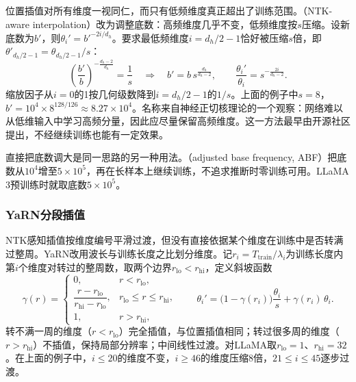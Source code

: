 位置插值对所有维度一视同仁，而只有低频维度真正超出了训练范围。（NTK-aware interpolation）改为调整底数：高频维度几乎不变，低频维度按$s$压缩。设新底数为$b'$，则$\theta_i'=b'^{-2i/d_h}$。要求最低频维度$i=d_h/2-1$恰好被压缩$s$倍，即$\theta'_{d_h/2-1}=\theta_{d_h/2-1}/s$：
\begin{equation}
 \left(\frac{b'}{b}\right)^{-\frac{d_h-2}{d_h}}=\frac1s
 \quad\Longrightarrow\quad
 b'=b\,s^{\frac{d_h}{d_h-2}},\qquad
 \frac{\theta_i'}{\theta_i}=s^{-\frac{2i}{d_h-2}}.
 \label{eq:nlp-llm-ntk-base}
\end{equation}
缩放因子从$i=0$的1按几何级数降到$i=d_h/2-1$的$1/s$。上面的例子中$s=8$，$b'=10^4\times8^{128/126}\approx8.27\times10^4$。名称来自神经正切核理论的一个观察：网络难以从低维输入中学习高频分量，因此应尽量保留高频维度。这一方法最早由开源社区提出，不经继续训练也能有一定效果。

直接把底数调大是同一思路的另一种用法。（adjusted base frequency, ABF）把底数从$10^4$增至$5\times10^5$，再在长样本上继续训练，不追求推断时零训练可用。LLaMA 3预训练时就取底数$5\times10^5$。

\subsubsection{YaRN分段插值}
\label{sec:nlp-llm-yarn}

NTK感知插值按维度编号平滑过渡，但没有直接依据某个维度在训练中是否转满过整周。YaRN改用波长与训练长度之比划分维度。记$r_i=T_{\mathrm{train}}/\lambda_i$为训练长度内第$i$个维度对转过的整周数，取两个边界$r_{\mathrm{lo}}<r_{\mathrm{hi}}$，定义斜坡函数
\begin{equation}
 \gamma(r)=
 \begin{cases}
  0, & r<r_{\mathrm{lo}},\\
  \dfrac{r-r_{\mathrm{lo}}}{r_{\mathrm{hi}}-r_{\mathrm{lo}}}, & r_{\mathrm{lo}}\leq r\leq r_{\mathrm{hi}},\\
  1, & r>r_{\mathrm{hi}},
 \end{cases}
 \qquad
 \theta_i'=\bigl(1-\gamma(r_i)\bigr)\frac{\theta_i}{s}+\gamma(r_i)\,\theta_i.
 \label{eq:nlp-llm-yarn-ramp}
\end{equation}
转不满一周的维度（$r<r_{\mathrm{lo}}$）完全插值，与位置插值相同；转过很多周的维度（$r>r_{\mathrm{hi}}$）不插值，保持局部分辨率；中间线性过渡。对LLaMA取$r_{\mathrm{lo}}=1$、$r_{\mathrm{hi}}=32$。在上面的例子中，$i\leq20$的维度不变，$i\geq46$的维度压缩8倍，$21\leq i\leq45$逐步过渡。

